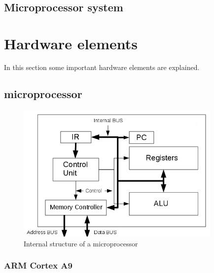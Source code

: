 \subsection{Microprocessor system}

\section{Hardware elements}
In this section some important hardware elements are explained.
\subsection{microprocessor}
\begin{figure}[htbp]
\begin{center}
\includegraphics[width=10cm,keepaspectratio=true]{bilder/png/microprocessorblockdiagram}
\caption{Internal structure of a microprocessor}
\label{fig:microprocessorblockdiagram}
\end{center}
\end{figure}
\subsubsection{ARM Cortex A9}
